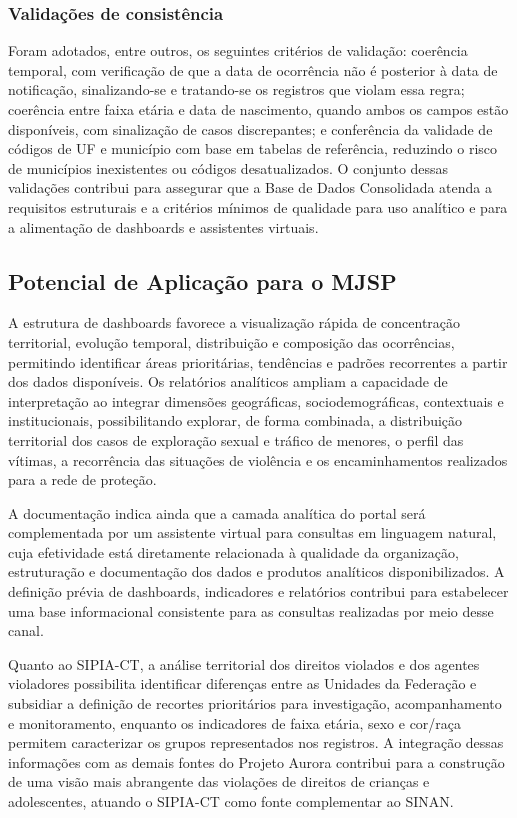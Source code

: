 \documentclass[11pt,a4paper]{article}
\begin{document}
\subsubsection{Validações de consistência}

Foram adotados, entre outros, os seguintes critérios de validação: coerência temporal, com verificação de que a data de ocorrência não é posterior à data de notificação, sinalizando-se e tratando-se os registros que violam essa regra; coerência entre faixa etária e data de nascimento, quando ambos os campos estão disponíveis, com sinalização de casos discrepantes; e conferência da validade de códigos de UF e município com base em tabelas de referência, reduzindo o risco de municípios inexistentes ou códigos desatualizados. O conjunto dessas validações contribui para assegurar que a Base de Dados Consolidada atenda a requisitos estruturais e a critérios mínimos de qualidade para uso analítico e para a alimentação de dashboards e assistentes virtuais.

\subsection{Potencial de Aplicação para o MJSP}
\label{subsec:aplicacao_mjsp}

A estrutura de dashboards favorece a visualização rápida de concentração territorial, evolução temporal, distribuição e composição das ocorrências, permitindo identificar áreas prioritárias, tendências e padrões recorrentes a partir dos dados disponíveis. Os relatórios analíticos ampliam a capacidade de interpretação ao integrar dimensões geográficas, sociodemográficas, contextuais e institucionais, possibilitando explorar, de forma combinada, a distribuição territorial dos casos de exploração sexual e tráfico de menores, o perfil das vítimas, a recorrência das situações de violência e os encaminhamentos realizados para a rede de proteção.

A documentação indica ainda que a camada analítica do portal será complementada por um assistente virtual para consultas em linguagem natural, cuja efetividade está diretamente relacionada à qualidade da organização, estruturação e documentação dos dados e produtos analíticos disponibilizados. A definição prévia de dashboards, indicadores e relatórios contribui para estabelecer uma base informacional consistente para as consultas realizadas por meio desse canal.

Quanto ao SIPIA-CT, a análise territorial dos direitos violados e dos agentes violadores possibilita identificar diferenças entre as Unidades da Federação e subsidiar a definição de recortes prioritários para investigação, acompanhamento e monitoramento, enquanto os indicadores de faixa etária, sexo e cor/raça permitem caracterizar os grupos representados nos registros. A integração dessas informações com as demais fontes do Projeto Aurora contribui para a construção de uma visão mais abrangente das violações de direitos de crianças e adolescentes, atuando o SIPIA-CT como fonte complementar ao SINAN.
\end{document}
